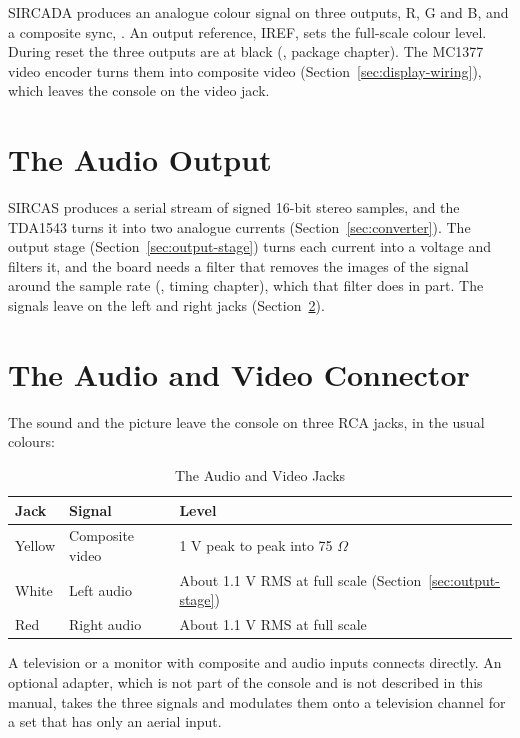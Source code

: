 SIRCADA produces an analogue colour signal on three outputs, R, G and B, and a composite sync, . An
output reference, IREF, sets the full-scale colour level. During reset the three outputs are at black (\videomanual{},
package chapter). The MC1377 video encoder turns them into composite video (Section~\ref{sec:display-wiring}), which
leaves the console on the video jack.

\section{The Audio Output}

SIRCAS produces a serial stream of signed 16-bit stereo samples, and the TDA1543 turns it into two analogue currents
(Section~\ref{sec:converter}). The output stage (Section~\ref{sec:output-stage}) turns each current into a voltage and
filters it, and the board needs a filter that removes the images of the signal around the sample rate (\audiomanual{},
timing chapter), which that filter does in part. The signals leave on the left and right jacks
(Section~\ref{sec:av-connector}).

\section{The Audio and Video Connector}
\label{sec:av-connector}

The sound and the picture leave the console on three RCA jacks, in the usual colours:

\begin{table}[H]
	\centering
	\begin{tabular}{lll}
		\toprule
		\textbf{Jack} & \textbf{Signal} & \textbf{Level}                                                 \\
		\midrule
		Yellow        & Composite video & 1 V peak to peak into 75 $\Omega$                              \\
		White         & Left audio      & About 1.1 V RMS at full scale (Section~\ref{sec:output-stage}) \\
		Red           & Right audio     & About 1.1 V RMS at full scale                                  \\
		\bottomrule
	\end{tabular}
	\caption{The Audio and Video Jacks}
	\label{tab:av-jacks}
\end{table}

\noindent A television or a monitor with composite and audio inputs connects directly. An optional adapter, which is not part of
the console and is not described in this manual, takes the three signals and modulates them onto a television channel
for a set that has only an aerial input.

